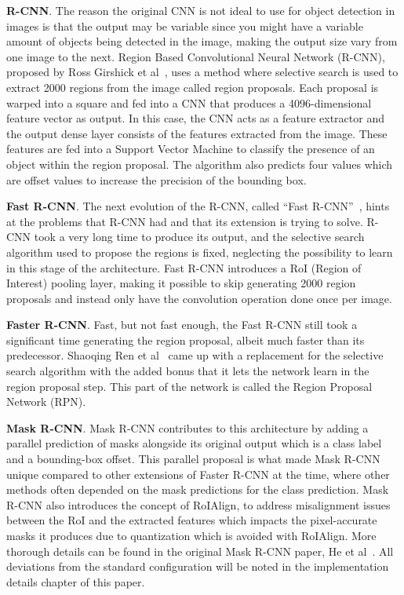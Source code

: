 \documentclass[english, bibtex]{kththesis}
\begin{document}
\textbf{R-CNN}. The reason the original CNN is not ideal to use for object detection in images is that the output may be variable since you might have a variable amount of objects being detected in the image, making the output size vary from one image to the next. Region Based Convolutional Neural Network (R-CNN), proposed by Ross Girshick et al~\cite{Girshick_2014_CVPR}, uses a method where selective search is used to extract 2000 regions from the image called region proposals. Each proposal is warped into a square and fed into a CNN that produces a 4096-dimensional feature vector as output. In this case, the CNN acts as a feature extractor and the output dense layer consists of the features extracted from the image. These features are fed into a Support Vector Machine to classify the presence of an object within the region proposal. The algorithm also predicts four values which are offset values to increase the precision of the bounding box.  

\textbf{Fast R-CNN}. The next evolution of the R-CNN, called “Fast R-CNN”~\cite{Girshick_2015_ICCV}, hints at the problems that R-CNN had and that its extension is trying to solve. R-CNN took a very long time to produce its output, and the selective search algorithm used to propose the regions is fixed, neglecting the possibility to learn in this stage of the architecture. Fast R-CNN introduces a RoI (Region of Interest) pooling layer, making it possible to skip generating 2000 region proposals and instead only have the convolution operation done once per image. 

\textbf{Faster R-CNN}. Fast, but not fast enough, the Fast R-CNN still took a significant time generating the region proposal, albeit much faster than its predecessor. Shaoqing Ren et al~\cite{7485869} came up with a replacement for the selective search algorithm with the added bonus that it lets the network learn in the region proposal step. This part of the network is called the Region Proposal Network (RPN). 

\textbf{Mask R-CNN}. Mask R-CNN contributes to this architecture by adding a parallel prediction of masks alongside its original output which is a class label and a bounding-box offset. This parallel proposal is what made Mask R-CNN unique compared to other extensions of Faster R-CNN at the time, where other methods often depended on the mask predictions for the class prediction. Mask R-CNN also introduces the concept of RoIAlign, to address misalignment issues between the RoI and the extracted features which impacts the pixel-accurate masks it produces due to quantization which is avoided with RoIAlign. More thorough details can be found in the original Mask R-CNN paper, He et al~\cite{DBLP:journals/corr/HeGDG17}. All deviations from the standard configuration will be noted in the implementation details chapter of this paper.
\end{document}
